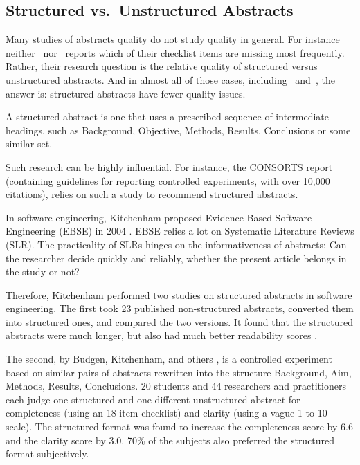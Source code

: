 \documentclass[10pt,journal,compsoc]{IEEEtran}
\begin{document}
\subsection{Structured vs.\ Unstructured Abstracts}\label{relatedworkstructured}

Many studies of abstracts quality do not study quality in general.
For instance neither~\cite{DupKhoLeb03} nor~\cite{ShaHar06} reports
which of their checklist items are missing most frequently.
Rather, their research question is the relative quality of structured
versus unstructured abstracts.
And in almost all of those cases, including~\cite{DupKhoLeb03} and~\cite{ShaHar06},
the answer is: structured abstracts have fewer quality issues.

A structured abstract is one that uses a prescribed sequence of 
intermediate headings, such as Background, Objective, Methods, Results,
Conclusions or some similar set.

Such research can be highly influential.
For instance, the CONSORTS report~\cite{MohHopSch12}
(containing guidelines for reporting controlled experiments, with over 10,000 citations),
relies on such a study \cite{HarSydBlu96} to recommend structured abstracts.

In software engineering, Kitchenham proposed
Evidence Based Software Engineering (EBSE) in 2004 \cite{KitDybJor04}.
EBSE relies a lot on Systematic Literature Reviews (SLR).
The practicality of SLRs hinges on the informativeness of abstracts:
Can the researcher decide quickly and reliably, whether the present article
belongs in the study or not?

Therefore, Kitchenham performed two studies on structured abstracts
in software engineering.
The first took 23 published non-structured abstracts, 
converted them into structured ones,
and compared the two versions. 
It found that the structured abstracts were much longer,
but also had much better readability scores \cite{KitBreOwe08}.

The second, by Budgen, Kitchenham, and others \cite{BudKitCha08},
is a controlled experiment based on similar pairs of abstracts
rewritten into the structure 
Background, Aim, Methods, Results, Conclusions.
20 students and 44 researchers and practitioners
each judge one structured and one different unstructured abstract
for completeness (using an 18-item checklist) and 
clarity (using a vague 1-to-10 scale).
The structured format was found to increase the 
completeness score by 6.6 and the clarity score by 3.0.
70\% of the subjects also preferred the structured format
subjectively.
\end{document}
